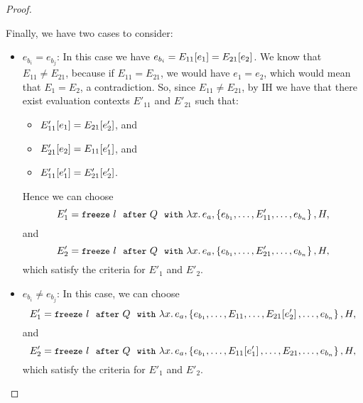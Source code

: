 \begin{proof}
\begin{itemize}
      Finally, we have two cases to consider:
      \begin{itemize}
      \item $e_{b_i} = e_{b_j}$: In this case we have $e_{b_i} =
        E_{11}\hspace{-0.5mm}\left[e_1\right] = E_{21}\hspace{-0.5mm}\left[e_2\right]$.  We know
        that $E_{11} \neq E_{21}$, because if $E_{11} = E_{21}$, we
        would have $e_1 = e_2$, which would mean that $E_1 = E_2$, a
        contradiction.  So, since $E_{11} \neq E_{21}$, by IH we
        have that there exist evaluation contexts $E'_{11}$ and
        $E'_{21}$ such that:
        \begin{itemize}
        \item $E'_{11}\hspace{-0.5mm}\left[e_1\right] = E_{21}\hspace{-0.5mm}\left[e'_2\right]$, and
        \item $E'_{21}\hspace{-0.5mm}\left[e_2\right] = E_{11}\hspace{-0.5mm}\left[e'_1\right]$, and
        \item $E'_{11}\hspace{-0.5mm}\left[e'_1\right] = E'_{21}\hspace{-0.5mm}\left[e'_2\right]$.
        \end{itemize}
        Hence we can choose
        \[E'_1 = \mbox{\small{\texttt{freeze}}}~l~~{\mbox{\small{\texttt{after}}}}~Q~~{\mbox{\small{\texttt{with}}}}~\lambda x.\,e_a, \left\{e_{b_1}, \dots,
            E'_{11}, \dots, e_{b_n}\right\}, H,\] and
        \[E'_2 = \mbox{\small{\texttt{freeze}}}~l~~{\mbox{\small{\texttt{after}}}}~Q~~{\mbox{\small{\texttt{with}}}}~\lambda x.\,e_a, \left\{e_{b_1}, \dots,
            E'_{21}, \dots, e_{b_n}\right\}, H,\] which satisfy the criteria
        for $E'_1$ and $E'_2$.

      \item $e_{b_i} \neq e_{b_j}$:
        In this case, we can choose
        \[E'_1 = \mbox{\small{\texttt{freeze}}}~l~~{\mbox{\small{\texttt{after}}}}~Q~~{\mbox{\small{\texttt{with}}}}~\lambda x.\,e_a, \left\{e_{b_1},
            \dots, E_{11}, \dots, E_{21}\hspace{-0.5mm}\left[e'_2\right], \dots,
            e_{b_n}\right\}, H,\] and
        \[E'_2 = \mbox{\small{\texttt{freeze}}}~l~~{\mbox{\small{\texttt{after}}}}~Q~~{\mbox{\small{\texttt{with}}}}~\lambda x.\,e_a, \left\{e_{b_1},
            \dots, E_{11}\hspace{-0.5mm}\left[e'_1\right], \dots, E_{21}, \dots,
            e_{b_n}\right\}, H,\] which satisfy the criteria for $E'_1$ and
        $E'_2$.
      \end{itemize}
  \end{itemize}
\end{proof}

